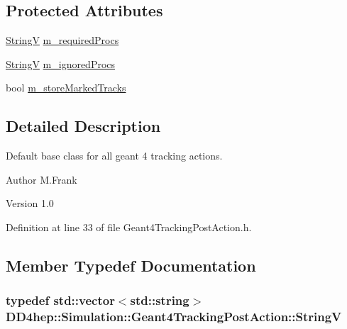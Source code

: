 \subsection*{Protected Attributes}
\begin{DoxyCompactItemize}
\item 
\hyperlink{class_d_d4hep_1_1_simulation_1_1_geant4_tracking_post_action_ae14809326747530052282a63ea5a362d}{StringV} \hyperlink{class_d_d4hep_1_1_simulation_1_1_geant4_tracking_post_action_a1194a1813aee919384ae90d6672d98c5}{m\_\-requiredProcs}
\item 
\hyperlink{class_d_d4hep_1_1_simulation_1_1_geant4_tracking_post_action_ae14809326747530052282a63ea5a362d}{StringV} \hyperlink{class_d_d4hep_1_1_simulation_1_1_geant4_tracking_post_action_abf458624a8077fc4533d3c830b9e240f}{m\_\-ignoredProcs}
\item 
bool \hyperlink{class_d_d4hep_1_1_simulation_1_1_geant4_tracking_post_action_a917619b10aa1e34636fb7fe49ad5575e}{m\_\-storeMarkedTracks}
\end{DoxyCompactItemize}


\subsection{Detailed Description}
Default base class for all geant 4 tracking actions. \begin{DoxyAuthor}{Author}
M.Frank 
\end{DoxyAuthor}
\begin{DoxyVersion}{Version}
1.0 
\end{DoxyVersion}


Definition at line 33 of file Geant4TrackingPostAction.h.

\subsection{Member Typedef Documentation}
\hypertarget{class_d_d4hep_1_1_simulation_1_1_geant4_tracking_post_action_ae14809326747530052282a63ea5a362d}{
\subsubsection[{StringV}]{\setlength{\rightskip}{0pt plus 5cm}typedef std::vector$<$std::string$>$ {\bf DD4hep::Simulation::Geant4TrackingPostAction::StringV}}}
\label{class_d_d4hep_1_1_simulation_1_1_geant4_tracking_post_action_ae14809326747530052282a63ea5a362d}


